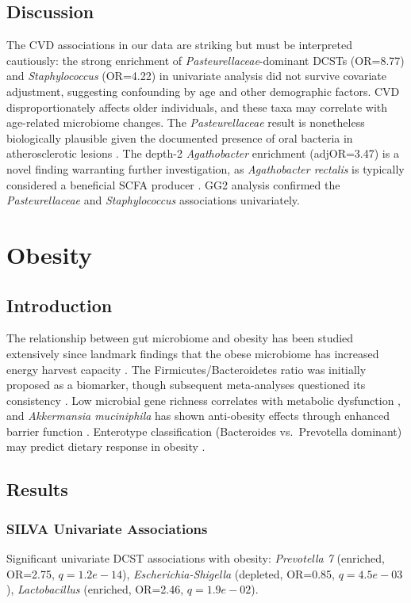 \documentclass[11pt,a4paper]{article}
\begin{document}
\subsection{Discussion}
The CVD associations in our data are striking but must be interpreted cautiously: the strong enrichment of \textit{Pasteurellaceae}-dominant DCSTs (OR=8.77) and \textit{Staphylococcus} (OR=4.22) in univariate analysis did not survive covariate adjustment, suggesting confounding by age and other demographic factors. CVD disproportionately affects older individuals, and these taxa may correlate with age-related microbiome changes. The \textit{Pasteurellaceae} result is nonetheless biologically plausible given the documented presence of oral bacteria in atherosclerotic lesions \cite{Jie2017_ASCVD}. The depth-2 \textit{Agathobacter} enrichment (adjOR=3.47) is a novel finding warranting further investigation, as \textit{Agathobacter rectalis} is typically considered a beneficial SCFA producer \cite{Wang2011_TMAO}. GG2 analysis confirmed the \textit{Pasteurellaceae} and \textit{Staphylococcus} associations univariately.
\newpage

\section{Obesity}
\subsection{Introduction}
The relationship between gut microbiome and obesity has been studied extensively since landmark findings that the obese microbiome has increased energy harvest capacity \cite{Turnbaugh2006_energy,Ley2006_obesity}. The Firmicutes/Bacteroidetes ratio was initially proposed as a biomarker, though subsequent meta-analyses questioned its consistency \cite{Walters2014_meta_obesity}. Low microbial gene richness correlates with metabolic dysfunction \cite{LeChatelier2013_richness}, and \textit{Akkermansia muciniphila} has shown anti-obesity effects through enhanced barrier function \cite{Everard2013_Akkermansia}. Enterotype classification (Bacteroides vs.\ Prevotella dominant) may predict dietary response in obesity \cite{Arumugam2011_enterotypes}.

\subsection{Results}
\subsubsection{SILVA Univariate Associations}
Significant univariate DCST associations with obesity: \textit{Prevotella 7} (enriched, OR=2.75, $q=1.2e-14$), \textit{Escherichia-Shigella} (depleted, OR=0.85, $q=4.5e-03$), \textit{Lactobacillus} (enriched, OR=2.46, $q=1.9e-02$).
\end{document}
